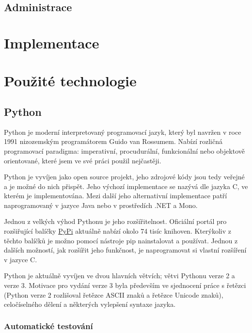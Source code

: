 \documentclass[16pt,titlepage,a4paper]{article}
\begin{document}
\subsection{Administrace}

\section{Implementace}
\label{sec:implementation}

\section{Použité technologie}

\subsection{Python}

Python je moderní interpretovaný programovací jazyk, který byl navržen v roce 1991 nizozemským programátorem Guido van Rossumem. Nabízí rozličná programovací paradigma: imperativní, procudurální, funkcionální nebo objektově orientované, které jsem ve své práci použil nejčastěji.

Python je vyvíjen jako open source projekt, jeho zdrojové kódy jsou tedy veřejné a je možné do nich přispět. Jeho výchozí implementace se nazývá  dle jazyka C, ve kterém je implementována. Mezi další jeho alternativní implementace patří  naprogramovaný v jazyce Java nebo  v prostředích .NET a Mono.

Jednou z velkých výhod Pythonu je jeho rozšířitelnost. Oficiální portál pro rozšiřující balíčky \href{https:\/\/pypi.python.org\/pypi}{PyPi} aktuálně nabízí okolo 74 tisíc knihoven. Kterýkoliv z těchto balíčků je možno pomocí nástroje pip nainstalovat a používat. Jednou z dalších možností, jak rozšířit jeho funkčnost, je naprogramovat si vlastní rozšíření v jazyce C.

Python je aktuálně vyvíjen ve dvou hlavních větvích; větvi Pythonu verze 2 a verze 3. Motivace pro vydání verze 3 byla především ve sjednocení práce s řetězci (Python verze 2 rozlišoval řetězce ASCII znaků a řetězce Unicode znaků), celočíselného dělení a některých vylepšení syntaxe jazyka.

\subsubsection{Automatické testování}
\end{document}
